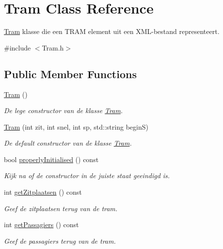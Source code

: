 \hypertarget{class_tram}{}\section{Tram Class Reference}
\label{class_tram}


\hyperlink{class_tram}{Tram} klasse die een T\+R\+AM element uit een X\+M\+L-\/bestand representeert.  




{\ttfamily \#include $<$Tram.\+h$>$}

\subsection*{Public Member Functions}
\begin{DoxyCompactItemize}
\item 
\hyperlink{class_tram_aad83b2e7e79d57528691bf317ab0e1ef}{Tram} ()
\begin{DoxyCompactList}\small\item\em De lege constructor van de klasse \hyperlink{class_tram}{Tram}. \end{DoxyCompactList}\item 
\hyperlink{class_tram_afef6559a85225dc0b8a9445d6d16cbbb}{Tram} (int zit, int snel, int sp, std\+::string beginS)
\begin{DoxyCompactList}\small\item\em De default constructor van de klasse \hyperlink{class_tram}{Tram}. \end{DoxyCompactList}\item 
bool \hyperlink{class_tram_ac2688f590e4db232b4f535c9bf959efb}{properly\+Initialised} () const
\begin{DoxyCompactList}\small\item\em Kijk na of de constructor in de juiste staat geeindigd is. \end{DoxyCompactList}\item 
int \hyperlink{class_tram_abcb1ce0d10e394fce8a99b460e5104de}{get\+Zitplaatsen} () const
\begin{DoxyCompactList}\small\item\em Geef de zitplaatsen terug van de tram. \end{DoxyCompactList}\item 
int \hyperlink{class_tram_a678ba2cd0c6ab76e966947944f599d56}{get\+Passagiers} () const
\begin{DoxyCompactList}\small\item\em Geef de passagiers terug van de tram. \end{DoxyCompactList}\item 

\end{DoxyCompactItemize}
